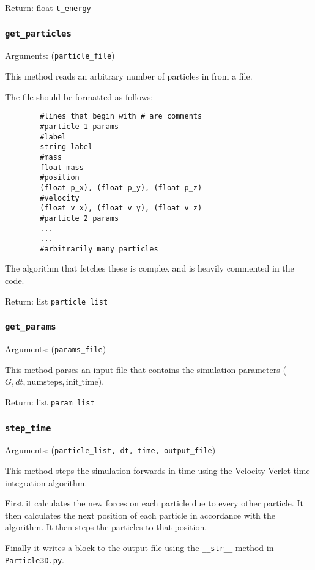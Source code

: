 \documentclass[a4paper, 11pt, british, left=1in, right=1in, top=0.3in, bottom=1in]{article}
\begin{document}
	Return: float \texttt{t\_energy}
	
	\subsubsection{\texttt{get\_particles}}
	
	Arguments: (\texttt{particle\_file})
	
	This method reads an arbitrary number of particles in from a file. 
	
	The file should be formatted as follows:
	
	\begin{verbatim}
		#lines that begin with # are comments
		#particle 1 params
		#label
		string label
		#mass
		float mass
		#position
		(float p_x), (float p_y), (float p_z)
		#velocity
		(float v_x), (float v_y), (float v_z)
		#particle 2 params
		...
		...
		#arbitrarily many particles
	\end{verbatim}
	
	The algorithm that fetches these is complex and is heavily commented in the code. 
	
	Return: list \texttt{particle\_list}
	
	\subsubsection{\texttt{get\_params}}
	
	Arguments: (\texttt{params\_file})
	
	This method parses an input file that contains the simulation parameters ($G, dt, \text{numsteps}, \text{init\_time}$).
	
	
	Return: list \texttt{param\_list}
	
	\subsubsection{\texttt{step\_time}}
	
	Arguments: (\texttt{particle\_list, dt, time, output\_file})
	
	This method steps the simulation forwards in time using the Velocity Verlet time integration algorithm. 
	
	First it calculates the new forces on each particle due to every other particle. It then calculates the next position of each particle in accordance with the algorithm. It then steps the particles to that position. 
	
	Finally it writes a block to the output file using the \texttt{\_\_str\_\_} method in \texttt{Particle3D.py}.
	
\end{document}
